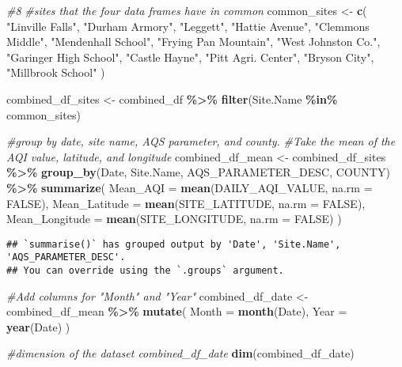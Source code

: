 \documentclass[
]{article}
\newenvironment{Shaded}{\begin{snugshade}}{\end{snugshade}}
\newcommand{\AttributeTok}[1]{\textcolor[rgb]{0.13,0.29,0.53}{#1}}
\newcommand{\CommentTok}[1]{\textcolor[rgb]{0.56,0.35,0.01}{\textit{#1}}}
\newcommand{\ConstantTok}[1]{\textcolor[rgb]{0.56,0.35,0.01}{#1}}
\newcommand{\FunctionTok}[1]{\textcolor[rgb]{0.13,0.29,0.53}{\textbf{#1}}}
\newcommand{\NormalTok}[1]{#1}
\newcommand{\OtherTok}[1]{\textcolor[rgb]{0.56,0.35,0.01}{#1}}
\newcommand{\SpecialCharTok}[1]{\textcolor[rgb]{0.81,0.36,0.00}{\textbf{#1}}}
\newcommand{\StringTok}[1]{\textcolor[rgb]{0.31,0.60,0.02}{#1}}
\begin{document}
\begin{Shaded}
\begin{Highlighting}[]
\CommentTok{\#8 }
\CommentTok{\#sites that the four data frames have in common}
\NormalTok{common\_sites }\OtherTok{\textless{}{-}} \FunctionTok{c}\NormalTok{(}
  \StringTok{"Linville Falls"}\NormalTok{, }\StringTok{"Durham Armory"}\NormalTok{, }\StringTok{"Leggett"}\NormalTok{, }\StringTok{"Hattie Avenue"}\NormalTok{,}
  \StringTok{"Clemmons Middle"}\NormalTok{, }\StringTok{"Mendenhall School"}\NormalTok{, }\StringTok{"Frying Pan Mountain"}\NormalTok{,}
  \StringTok{"West Johnston Co."}\NormalTok{, }\StringTok{"Garinger High School"}\NormalTok{, }\StringTok{"Castle Hayne"}\NormalTok{,}
  \StringTok{"Pitt Agri. Center"}\NormalTok{, }\StringTok{"Bryson City"}\NormalTok{, }\StringTok{"Millbrook School"}
\NormalTok{)}

\NormalTok{combined\_df\_sites }\OtherTok{\textless{}{-}}\NormalTok{ combined\_df }\SpecialCharTok{\%\textgreater{}\%}
  \FunctionTok{filter}\NormalTok{(Site.Name }\SpecialCharTok{\%in\%}\NormalTok{ common\_sites)}

\CommentTok{\#group by date, site name, AQS parameter, and county. }
\CommentTok{\#Take the mean of the AQI value, latitude, and longitude}
\NormalTok{combined\_df\_mean }\OtherTok{\textless{}{-}}\NormalTok{ combined\_df\_sites }\SpecialCharTok{\%\textgreater{}\%}
  \FunctionTok{group\_by}\NormalTok{(Date, Site.Name, AQS\_PARAMETER\_DESC, COUNTY) }\SpecialCharTok{\%\textgreater{}\%}
  \FunctionTok{summarize}\NormalTok{(}
    \AttributeTok{Mean\_AQI =} \FunctionTok{mean}\NormalTok{(DAILY\_AQI\_VALUE, }\AttributeTok{na.rm =} \ConstantTok{FALSE}\NormalTok{),}
    \AttributeTok{Mean\_Latitude =} \FunctionTok{mean}\NormalTok{(SITE\_LATITUDE, }\AttributeTok{na.rm =} \ConstantTok{FALSE}\NormalTok{),}
    \AttributeTok{Mean\_Longitude =} \FunctionTok{mean}\NormalTok{(SITE\_LONGITUDE, }\AttributeTok{na.rm =} \ConstantTok{FALSE}\NormalTok{)}
\NormalTok{    )}
\end{Highlighting}
\end{Shaded}

\begin{verbatim}
## `summarise()` has grouped output by 'Date', 'Site.Name', 'AQS_PARAMETER_DESC'.
## You can override using the `.groups` argument.
\end{verbatim}

\begin{Shaded}
\begin{Highlighting}[]
\CommentTok{\#Add columns for "Month" and "Year"}
\NormalTok{combined\_df\_date }\OtherTok{\textless{}{-}}\NormalTok{ combined\_df\_mean }\SpecialCharTok{\%\textgreater{}\%}
  \FunctionTok{mutate}\NormalTok{(}
    \AttributeTok{Month =} \FunctionTok{month}\NormalTok{(Date),}
    \AttributeTok{Year =} \FunctionTok{year}\NormalTok{(Date)}
\NormalTok{  )}

\CommentTok{\#dimension of the dataset combined\_df\_date}
\FunctionTok{dim}\NormalTok{(combined\_df\_date)}
\end{Highlighting}
\end{Shaded}
\end{document}
